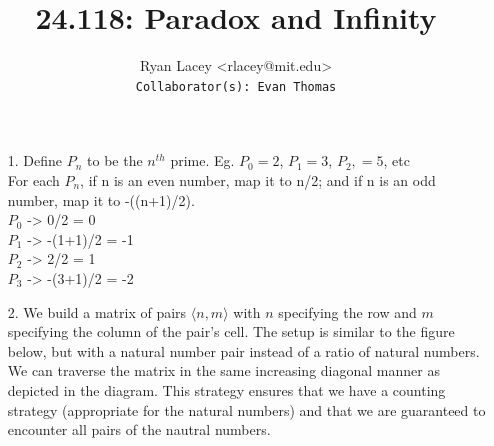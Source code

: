 \documentclass{article}
\begin{document}

\title{24.118: Paradox and Infinity}
\author{
  Ryan Lacey <rlacey@mit.edu>\\
  \footnotesize \texttt{Collaborator(s): Evan Thomas}
}
        
\maketitle
        


\begin{enumerate}
\item[1.]
	Define $P_n$ to be the $n^{th}$ prime. Eg. $P_0=2$, $P_1=3$, $P_2,=5$, etc\\
	
	For each $P_n$, if n is an even number, map it to n/2; and if n is an odd number, map it to -((n+1)/2).\\
	
	$P_0$ -> 0/2 = 0\\
	$P_1$ -> -(1+1)/2 = -1\\
	$P_2$ -> 2/2 = 1\\
	$P_3$ -> -(3+1)/2 = -2\\

\item[2.]
	We build a matrix of pairs $\langle n, m \rangle$  with $n$ specifying the row and $m$ specifying the column of the pair's cell. The setup is similar to the figure below, but with a natural number pair instead of a ratio of natural numbers. We can traverse the matrix in the same increasing diagonal manner as depicted in the diagram. This strategy ensures that we have a counting strategy (appropriate for the natural numbers) and that we are guaranteed to encounter all pairs of the nautral numbers.\\

\bigskip


\end{enumerate}
\end{document}
